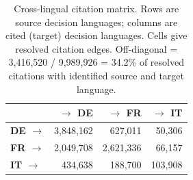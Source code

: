 \begin{table}[H]
\centering
\caption{Cross-lingual citation matrix. Rows are source decision languages; columns are cited (target) decision languages. Cells give resolved citation edges. Off-diagonal = 3,416,520 / 9,989,926 = 34.2\% of resolved citations with identified source and target language.}
\label{tab:cross_lang_citation}
\small
\begin{tabular}{l r r r}
\toprule
& \textbf{$\to$ DE} & \textbf{$\to$ FR} & \textbf{$\to$ IT} \\
\midrule
\textbf{DE $\to$} & 3,848,162 & 627,011 & 50,306 \\
\textbf{FR $\to$} & 2,049,708 & 2,621,336 & 66,157 \\
\textbf{IT $\to$} & 434,638 & 188,700 & 103,908 \\
\bottomrule
\end{tabular}
\end{table}
